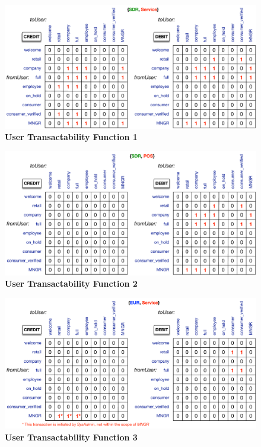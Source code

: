 \begin{figure}[H]
\vspace{-0.5cm}
\centering
\includegraphics[width=16cm]{Figures/UTF1}
\caption{\small\textbf{User Transactability Function 1}}
\label{fig:UTF1}
\end{figure}

\begin{figure}[H]
\centering
\includegraphics[width=16cm]{Figures/UTF2}
\caption{\small\textbf{User Transactability Function 2}}
\label{fig:UTF2}
\vspace{-1cm}
\end{figure}

\begin{figure}[H]
\vspace{-0.5cm}
\centering
\includegraphics[width=16cm]{Figures/UTF3}
\caption{\small\textbf{User Transactability Function 3}}
\label{fig:UTF3}
\vspace{-1cm}
\end{figure}

